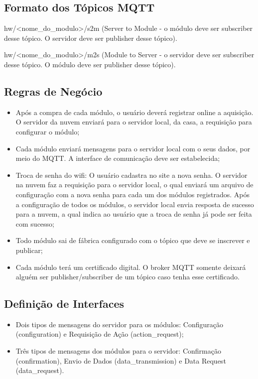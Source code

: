 \subsection{Formato dos Tópicos MQTT}
hw/<nome_do_modulo>/s2m (Server to Module - o módulo deve ser subscriber desse tópico. O servidor deve ser publisher desse tópico).

hw/<nome_do_modulo>/m2s (Module to Server - o servidor deve ser subscriber desse tópico. O módulo deve ser publisher desse tópico).

\subsection{Regras de Negócio}

\begin{itemize}
\item Após a compra de cada módulo, o usuário deverá registrar online a aquisição. O servidor da nuvem enviará para o servidor local, da casa, a requisição para configurar o módulo;
\item Cada módulo enviará mensagens para o servidor local com o seus dados, por meio do MQTT. A interface de comunicação deve ser estabelecida;
\item Troca de senha do wifi: O usuário cadastra no site a nova senha. O servidor na nuvem faz a requisição para o servidor local, o qual enviará um arquivo de configuração com a nova senha para cada um dos módulos registrados. Após a configuração de todos os módulos, o servidor local envia resposta de sucesso para a nuvem, a qual indica ao usuário que a troca de senha já pode ser feita com sucesso;
\item Todo módulo sai de fábrica configurado com o tópico que deve se inscrever e publicar;
\item Cada módulo terá um certificado digital. O broker MQTT somente deixará alguém ser publisher/subscriber de um tópico caso tenha esse certificado.
\end{itemize}

\subsection{Definição de Interfaces}
\begin{itemize}
\item Dois tipos de mensagens do servidor para os módulos: Configuração (configuration) e Requisição de Ação (action_request);
\item Três tipos de mensagens dos módulos para o servidor: Confirmação (confirmation), Envio de Dados (data_transmission) e Data Request (data_request).
\end{itemize}


